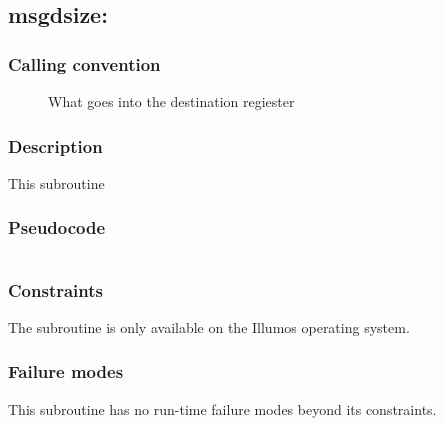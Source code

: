\clearpage
{}
{}
\label{subr:msgdsize}
\subsection*{msgdsize: }

\subsubsection*{Calling convention}

\begin{description}
\item[] What goes into the destination regiester
\end{description}

\subsubsection*{Description}

This subroutine 
\subsubsection*{Pseudocode}

\begin{verbatim}
\end{verbatim}

\subsubsection*{Constraints}

The  subroutine is only available on the Illumos
operating system.

\subsubsection*{Failure modes}

This subroutine has no run-time failure modes beyond its constraints.
